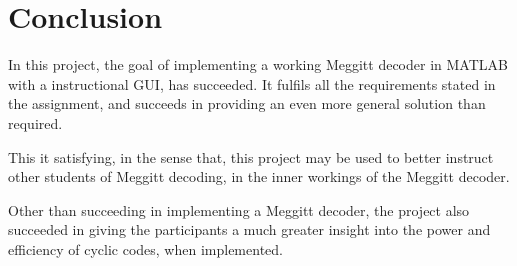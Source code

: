 \documentclass[MiniProjectMain]{subfiles}
\begin{document}
\chapter{Conclusion}
In this project, the goal of implementing a working Meggitt decoder in MATLAB with a instructional GUI, has succeeded.
It fulfils all the requirements stated in the assignment, and succeeds in providing an even more general solution than required.

This it satisfying, in the sense that, this project may be used to better instruct other students of Meggitt decoding, in the inner workings of the Meggitt decoder. 

Other than succeeding in implementing a Meggitt decoder, the project also succeeded in giving the participants a much greater insight into the power and efficiency of cyclic codes, when implemented.
\end{document}
